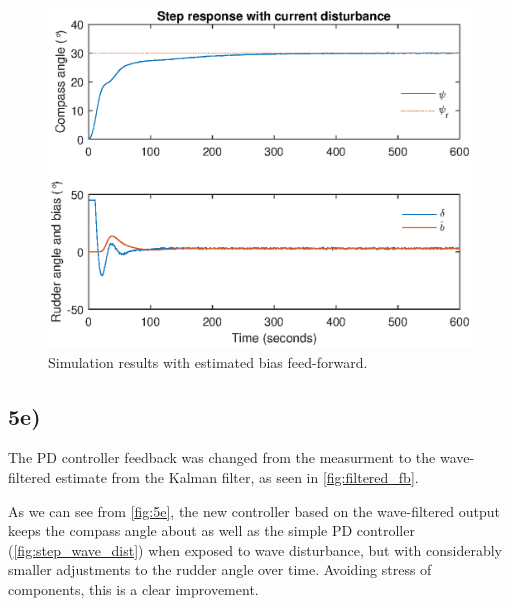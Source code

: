\begin{figure}
    \centering
    \includegraphics[width=\textwidth]{images/oppg5/5d.eps}
    \caption{Simulation results with estimated bias feed-forward.}
    \label{fig:5d}
\end{figure}


\subsection{5e)}

The PD controller feedback was changed from the measurment to the wave-filtered estimate from the Kalman filter, as seen in \cref{fig:filtered_fb}.

As we can see from \cref{fig:5e}, the new controller based on the wave-filtered output keeps the compass angle about as well as the simple PD controller (\cref{fig:step_wave_dist}) when exposed to wave disturbance, but with considerably smaller adjustments to the rudder angle over time. Avoiding stress of components, this is a clear improvement.

